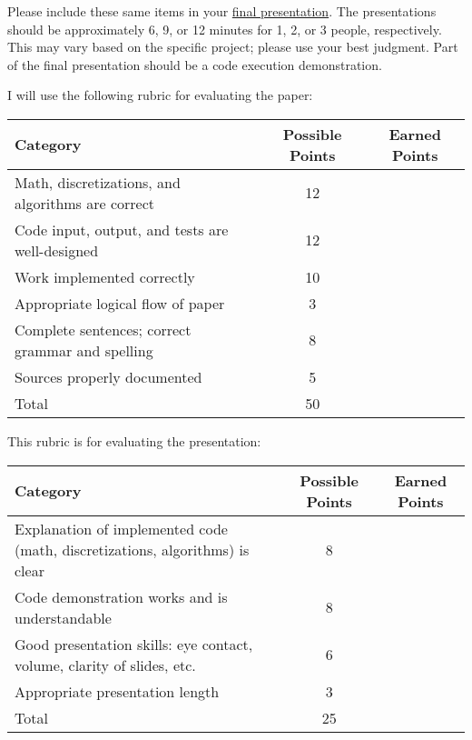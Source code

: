 \documentclass[a4paper, 12 pt]{curve}
\begin{document}
\vspace*{2em}
Please include these same items in your \underline{final presentation}. The presentations should be approximately 6, 9, or 12 minutes for 1, 2, or 3 people, respectively.  This may vary based on the specific project; please use your best judgment. Part of the final presentation should be a code execution demonstration.

\vspace*{2em}


\vspace*{2em}
I will use the following rubric for evaluating the paper:

\begin{center}
\begin{tabu}{| X | c | c |}\hline
\textbf{Category} & \textbf{Possible Points} & \textbf{Earned Points} \\ \hline \hline
Math, discretizations, and algorithms are correct & 12 & \\ \hline
Code input, output, and tests are well-designed & 12 & \\ \hline
Work implemented correctly & 10 & \\ \hline
Appropriate logical flow of paper & 3 & \\ \hline
Complete sentences; correct grammar and spelling & 8 & \\ \hline
Sources properly documented & 5 & \\ \hline
Total & 50 & \\\hline
\end{tabu} 
\end{center}

\vspace*{1 em}
This rubric is for evaluating the presentation:


\begin{center}
\begin{tabu}{| X | c | c |}\hline
\textbf{Category} & \textbf{Possible Points} & \textbf{Earned Points} \\ \hline \hline
Explanation of implemented code (math, discretizations, algorithms) is clear & 8 & \\ \hline
Code demonstration works and is understandable & 8 & \\ \hline
Good presentation skills: eye contact, volume, clarity of slides, etc. & 6 & \\ \hline
Appropriate presentation length & 3 & \\ \hline
Total & 25 & \\\hline
\end{tabu} 
\end{center}
\end{document}
